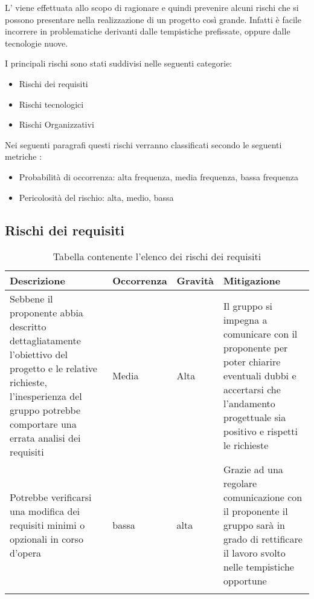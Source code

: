 \documentclass[../piano_di_progetto.tex]{subfiles}
\begin{document}
L’  viene effettuata allo scopo di ragionare e quindi prevenire alcuni rischi che si possono presentare nella realizzazione di un progetto così grande. Infatti è facile incorrere in problematiche derivanti dalle tempistiche prefissate, oppure dalle tecnologie nuove.

I principali rischi sono stati suddivisi nelle seguenti categorie:
\begin{itemize}
\item Rischi dei requisiti 
\item Rischi tecnologici 
\item Rischi Organizzativi
\end{itemize}
Nei seguenti paragrafi questi rischi verranno classificati secondo le seguenti metriche :
\begin{itemize}
\item Probabilità di occorrenza: alta frequenza, media frequenza, bassa frequenza
\item Pericolosità del rischio: alta, medio, bassa
\end{itemize}

\subsection{Rischi dei requisiti}%
\label{sub:rischi_req}

\begin{center}
	\begin{longtable}{|p{3.5cm}|p{2cm}|p{2cm}|p{3.5cm}|}
		\hline
		\rowcolor{lightgray}
		{\textbf{Descrizione}} & {\textbf{Occorrenza}} & {\textbf{Gravità}} & {\textbf{Mitigazione}} \\

		\hline
			Sebbene il proponente abbia descritto dettagliatamente l’obiettivo del progetto e le relative richieste, l’inesperienza del gruppo potrebbe comportare una errata analisi dei requisiti
			&
			Media
			& 
			Alta
			&
			Il gruppo si impegna a comunicare con il proponente per poter chiarire eventuali dubbi e accertarsi che l’andamento progettuale sia positivo e rispetti le richieste\\
			
			\hline
			Potrebbe verificarsi una modifica dei requisiti minimi o opzionali in corso d’opera
			&
			bassa
			& 
			alta
			& 
			Grazie ad una regolare comunicazione con il proponente il gruppo sarà in grado di rettificare il lavoro svolto nelle tempistiche opportune\\
			\hline
\caption{Tabella contenente l'elenco dei rischi dei requisiti}
	\end{longtable}

\end{center}
\end{document}
